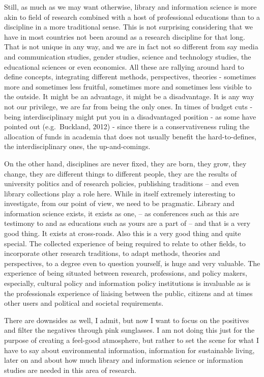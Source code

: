 ﻿\documentclass[a4paper,
fontsize=11pt,
oneside,
numbers=noperiodatend,
parskip=half-,
bibliography=totoc,
final
]{scrartcl}
\begin{document}
Still, as much as we may want otherwise, library and information science
is more akin to field of research combined with a host of professional
educations than to a discipline in a more traditional sense. This is not
surprising considering that we have in most countries not been around as
a research discipline for that long. That is not unique in any way, and
we are in fact not so different from say media and communication
studies, gender studies, science and technology studies, the educational
sciences or even economics. All these are rallying around hard to define
concepts, integrating different methods, perspectives, theories -
sometimes more and sometimes less fruitful, sometimes more and sometimes
less visible to the outside. It might be an advantage, it might be a
disadvantage. It is any way not our privilege, we are far from being the
only ones. In times of budget cuts - being interdisciplinary might put
you in a disadvantaged position - as some have pointed out
(e.g.~Buckland, 2012) - since there is a conservativeness ruling the
allocation of funds in academia that does not usually benefit the
hard-to-defines, the interdisciplinary ones, the up-and-comings.

On the other hand, disciplines are never fixed, they are born, they
grow, they change, they are different things to different people, they
are the results of university politics and of research policies,
publishing traditions -- and even library collections play a role here.
While in itself extremely interesting to investigate, from our point of
view, we need to be pragmatic. Library and information science exists,
it exists as one, -- as conferences such as this are testimony to and as
educations such as yours are a part of -- and that is a very good thing.
It exists at cross-roads. Also this is a very good thing and quite
special. The collected experience of being required to relate to other
fields, to incorporate other research traditions, to adapt methods,
theories and perspectives, to a degree even to question yourself, is
huge and very valuable. The experience of being situated between
research, professions, and policy makers, especially, cultural policy
and information policy institutions is invaluable as is the
professionals experience of liaising between the public, citizens and at
times other users and political and societal requirements.

There are downsides as well, I admit, but now I want to focus on the
positives and filter the negatives through pink sunglasses. I am not
doing this just for the purpose of creating a feel-good atmosphere, but
rather to set the scene for what I have to say about environmental
information, information for sustainable living, later on and about how
much library and information science or information studies are needed
in this area of research.
\end{document}
